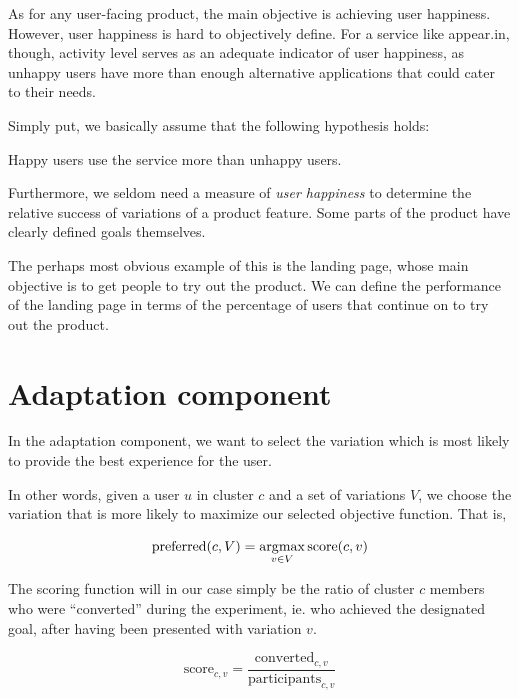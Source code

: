 As for any user-facing product, the main objective is achieving user happiness. However, user happiness is hard to objectively define. For a service like appear.in, though, activity level serves as an adequate indicator of user happiness, as unhappy users have more than enough alternative applications that could cater to their needs.

Simply put, we basically assume that the following hypothesis holds:

\begin{hypothesis}
  Happy users use the service more than unhappy users.
\end{hypothesis}

Furthermore, we seldom need a measure of \emph{user happiness} to determine the relative success of variations of a product feature. Some parts of the product have clearly defined goals themselves.

The perhaps most obvious example of this is the landing page, whose main objective is to get people to try out the product. We can define the performance of the landing page in terms of the percentage of users that continue on to try out the product.

\section{Adaptation component} %
\label{approach:sec:adaptation_component}

In the adaptation component, we want to select the variation which is most likely to provide the best experience for the user.

In other words, given a user $u$ in cluster $c$ and a set of variations $V$, we choose the variation that is more likely to maximize our selected objective function. That is,

\begin{equation}
  \text{preferred}(c, V) = \operatorname*{\arg\!\max}_{v \in V} \text{score}(c, v)
\end{equation}

The scoring function will in our case simply be the ratio of cluster $c$ members who were ``converted'' during the experiment, ie. who achieved the designated goal, after having been presented with variation $v$.

\begin{equation}
  \text{score}_{c,v} = \frac{\text{converted}_{c,v}}{\text{participants}_{c,v}}
\end{equation}

